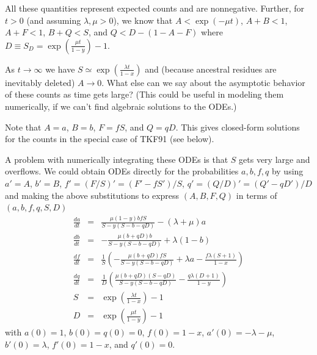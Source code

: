 \documentclass{article}
\begin{document}
All these quantities represent expected counts and are nonnegative.
Further, for $t>0$ (and assuming $\lambda,\mu > 0$), we know that
$A < \exp(-\mu t)$, $A+B<1$, $A+F<1$, $B+Q<S$, and $Q<D-(1-A-F)$
where $D \equiv S_D = \exp\left(\frac{\mu t}{1-y}\right) - 1$.

As $t \to \infty$ we have $S \simeq \exp\left(\frac{\lambda t}{1-x}\right)$ and (because ancestral residues are inevitably deleted) $A \to 0$.
What else can we say about the asymptotic behavior of these counts as time gets large?
(This could be useful in modeling them numerically, if we can't find algebraic solutions to the ODEs.)


Note that $A=a$, $B=b$, $F=fS$, and $Q=qD$.
This gives closed-form solutions for the counts in the special case of TKF91 (see below).

A problem with numerically integrating these ODEs is that $S$ gets very large and overflows.
We could obtain ODEs directly for the probabilities $a,b,f,q$
by using $a'=A$, $b'=B$, $f'=(F/S)'=(F'-fS')/S$, $q'=(Q/D)'=(Q'-qD')/D$
and making the above substitutions to express $(A,B,F,Q)$ in terms of $(a,b,f,q,S,D)$
\begin{eqnarray*}
  \frac{da}{dt} & = & \frac{\mu (1-y) b f S}{S - y(S-b-q D)} - (\lambda +\mu ) a \\
  \frac{db}{dt} & = & -\frac{\mu (b+q D) b}{S - y(S-b-q D)} + \lambda (1-b) \\
  \frac{df}{dt} & = & \frac{1}{S} \left( -\frac{\mu (b+q D) f S}{S - y(S-b-q D)} + \lambda a - \frac{f \lambda(S+1)}{1-x} \right) \\
  \frac{dq}{dt} & = & \frac{1}{D} \left( \frac{\mu (b+q D) (S-q D)}{S - y(S-b-q D)} - \frac{q \lambda(D+1)}{1-y} \right) \\
  S & = & \exp\left(\frac{\lambda t}{1-x}\right)-1 \\
  D & = & \exp\left(\frac{\mu t}{1-y}\right)-1
\end{eqnarray*}
with $a(0)=1$, $b(0)=q(0)=0$, $f(0)=1-x$,
$a'(0)=-\lambda-\mu$, $b'(0)=\lambda$, $f'(0)=1-x$, and $q'(0)=0$.   %
\end{document}
